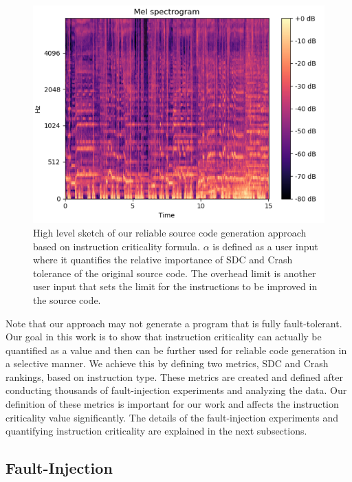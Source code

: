 \begin{figure}[!t]
\begin{center}
\includegraphics[scale=0.3]{./figures/pop.png}
\end{center}
\caption
{
High level sketch of our reliable source code generation approach based on instruction criticality formula. $\alpha$ is defined as a user input where it quantifies the relative importance of SDC and Crash tolerance of the original source code. The overhead limit is another user input that sets the limit for the instructions to be improved in the source code. 
}
\label{fig:big_picture2}
\end{figure}

Note that our approach may not generate a program that is fully fault-tolerant. Our goal in this work is to show that instruction criticality can actually be quantified as a value and then can be further used for reliable code generation in a selective manner. We achieve this by defining two metrics, SDC and Crash rankings, based on instruction type. These metrics are created and defined after conducting thousands of fault-injection experiments and analyzing the data. Our definition of these metrics is important for our work and affects the instruction criticality value significantly. The details of the fault-injection experiments and quantifying instruction criticality are explained in the next subsections. 


\subsection{Fault-Injection}

